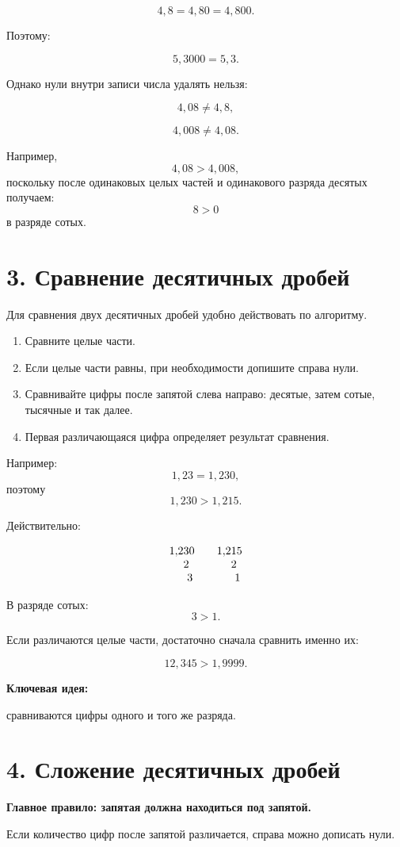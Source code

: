 \documentclass[a4paper,12pt]{article}
\newcommand{\sectiontitle}[1]{%
  \section*{\color{darkaccent}#1}%
}
\newcommand{\important}[1]{%
  \textbf{\color{darkaccent}#1}%
}
\begin{document}
\[
4{,}8=4{,}80=4{,}800.
\]

Поэтому:

\[
5{,}3000=5{,}3.
\]

Однако нули внутри записи числа удалять нельзя:

\[
4{,}08\ne4{,}8,
\]

\[
4{,}008\ne4{,}08.
\]

Например,
\[
4{,}08>4{,}008,
\]
поскольку после одинаковых целых частей и одинакового разряда
десятых получаем:
\[
8>0
\]
в разряде сотых.


\sectiontitle{3. Сравнение десятичных дробей}

Для сравнения двух десятичных дробей удобно действовать по алгоритму.

\begin{enumerate}
  \item Сравните целые части.
  \item Если целые части равны, при необходимости допишите справа нули.
  \item Сравнивайте цифры после запятой слева направо:
        десятые, затем сотые, тысячные и так далее.
  \item Первая различающаяся цифра определяет результат сравнения.
\end{enumerate}

Например:
\[
1{,}23=1{,}230,
\]
поэтому
\[
1{,}230>1{,}215.
\]

Действительно:

\[
\begin{array}{c@{\qquad}c}
1{,}230 & 1{,}215\\
\phantom{1,}2 & \phantom{1,}2\\
\phantom{1,2}3 & \phantom{1,2}1
\end{array}
\]

В разряде сотых:
\[
3>1.
\]

Если различаются целые части, достаточно сначала сравнить именно их:

\[
12{,}345>1{,}9999.
\]

\important{Ключевая идея:}
сравниваются цифры одного и того же разряда.


\sectiontitle{4. Сложение десятичных дробей}

\important{Главное правило: запятая должна находиться под запятой.}

Если количество цифр после запятой различается,
справа можно дописать нули.
\end{document}

